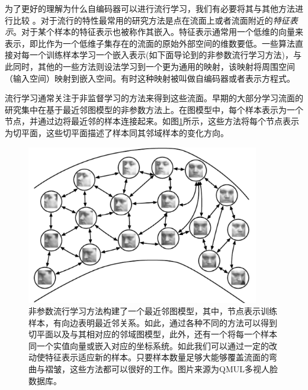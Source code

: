 为了更好的理解为什么自编码器可以进行流行学习，我们有必要将其与其他方法进行比较 。对于流行的特性最常用的研究方法是点在流面上或者流面附近的\emph{特征表示}。对于某个样本的特征表示也被称作其嵌入。特征表示通常用一个低维的向量来表示，即比作为一个低维子集存在的流面的原始外部空间的维数要低。一些算法直接对每一个训练样本学习一个嵌入表示(如下面导论到的非参数流行学习方法)，与此同时，其他的一些方法则设法学习到一个更为通用的映射，该映射将周围空间（输入空间）映射到嵌入空间。有时这种映射被叫做自编码器或者表示方程式。 

流行学习通常关注于非监督学习的方法来得到这些流面。早期的大部分学习流面的研究集中在基于最近邻图模型的非参数方法上。在图模型中，每个样本表示为一个节点，并通过边将最近邻的样本连接起来。如图\ref{fig:14.8}所示，这些方法将每个节点表示为切平面，这些切平面描述了样本同其邻域样本的变化方向。
\begin{figure}[htbp] %
   \centering
   \includegraphics[width=4in]{fig/chap14/14_8.png} 
   \caption{非参数流行学习方法构建了一个最近邻图模型，其中，节点表示训练样本，有向边表明最近邻关系。如此，通过各种不同的方法可以得到切平面以及与其相对应的邻域图模型，此外，还有一个将每一个样本同一个实值向量或嵌入对应的坐标系统。如此我们可以通过一定的改动使特征表示适应新的样本。只要样本数量足够大能够覆盖流面的弯曲与褶皱，这些方法都可以很好的工作。图片来源为QMUL多视人脸数据库。}
   \label{fig:14.8}
\end{figure}

